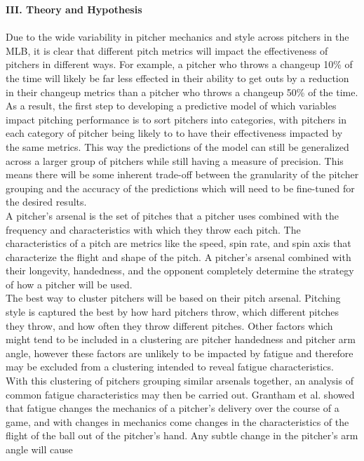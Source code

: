 \documentclass[12 pt]{article}
\begin{document}
\textbf{III. Theory and Hypothesis} \\ \\
\indent Due to the wide variability in pitcher mechanics and style across pitchers in the 
MLB, it is clear that different pitch metrics will impact the effectiveness of 
pitchers in different ways. For example, a pitcher who throws a changeup 10\% of the time will likely 
be far less effected in their ability to get outs by a reduction in their changeup metrics than 
a pitcher who throws a changeup 50\% of the time. As a result, the first step to developing 
a predictive model of which variables impact pitching performance is to sort 
pitchers into categories, with pitchers in each category of pitcher being likely to 
to have their effectiveness impacted by the same metrics. This way the predictions of 
the model can still be generalized across a larger group of pitchers while still having a measure of 
precision. This means there will be some inherent trade-off between the granularity of the 
pitcher grouping and the accuracy of the predictions which will need to be fine-tuned 
for the desired results.
\\ \indent A pitcher's arsenal is the set of pitches that a pitcher uses combined 
with the frequency and characteristics with which they throw each pitch. The characteristics 
of a pitch are metrics like the speed, spin rate, and spin axis that characterize the flight 
and shape of the pitch. A pitcher's arsenal combined with their longevity, handedness, and the opponent 
completely determine the strategy of how a pitcher will be used.
\\ \indent The best way to cluster pitchers will be based on their pitch arsenal. 
Pitching style is captured the best by how hard pitchers throw, which different pitches 
they throw, and how often they throw different pitches. Other factors which might tend 
to be included in a clustering are pitcher handedness and pitcher arm angle, however 
these factors are unlikely to be impacted by fatigue and therefore may be excluded from 
a clustering intended to reveal fatigue characteristics.
\\ \indent With this clustering of pitchers grouping similar arsenals together, 
an analysis of common fatigue characteristics may then be carried out. Grantham et al. showed 
that fatigue changes the mechanics of a pitcher's delivery over the course of a game, and 
with changes in mechanics come changes in the characteristics of the flight of the 
ball out of the pitcher's hand. Any subtle change in the pitcher's arm angle will cause 
\end{document}
